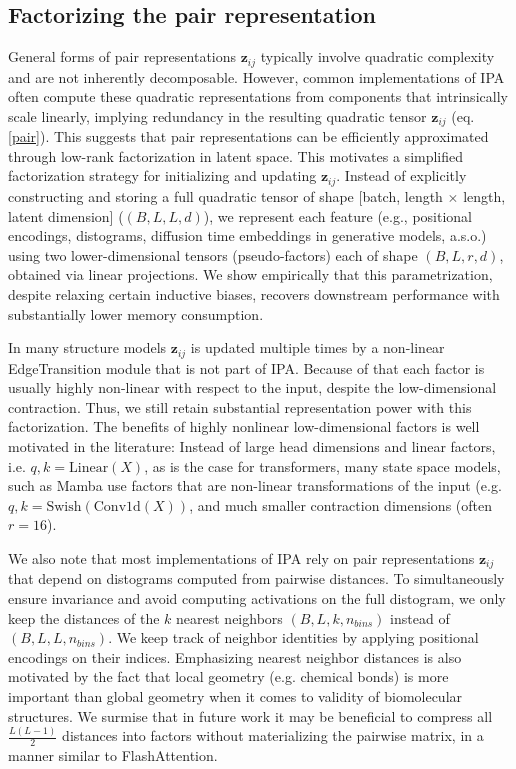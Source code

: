 \documentclass{article}
\begin{document}
\subsection{Factorizing the pair representation }
General forms of pair representations $\mathbf{z}_{ij}$ typically involve quadratic complexity and are not inherently decomposable. However, common implementations of IPA often compute these quadratic representations from components that intrinsically scale linearly, implying redundancy in the resulting quadratic tensor $\mathbf{z}_{ij}$ (eq. \eqref{pair}). This suggests that pair representations can be efficiently approximated through low-rank factorization in latent space. This motivates a simplified factorization strategy for initializing and updating $\mathbf{z}_{ij}$. Instead of explicitly constructing and storing a full quadratic tensor of shape [batch, length $\times$ length, latent dimension] ($(B,L,L,d)$), we represent each feature (e.g., positional encodings, distograms, diffusion time embeddings in generative models, a.s.o.) using two lower-dimensional tensors (pseudo-factors) each of shape $(B,L,r,d)$, obtained via linear projections. We show empirically that this parametrization, despite relaxing certain inductive biases, recovers downstream performance with substantially lower memory consumption.


In many structure models $\mathbf{z}_{ij}$ is updated multiple times by a non-linear EdgeTransition module that is not part of IPA. Because of that each factor is usually highly non-linear with respect to the input, despite the low-dimensional contraction. 
Thus, we still retain substantial representation power with this factorization. The benefits of highly nonlinear low-dimensional factors is well motivated in the literature:
Instead of large head dimensions and linear factors, i.e. $q,k=\textrm{Linear}\left(X\right)$, as is the case for transformers, many state space models, such as Mamba \cite{gu2023mamba} use factors that are non-linear transformations of the input (e.g. $q,k=\textrm{Swish}\left(\textrm{Conv1d}\left(X\right)\right)$, and much smaller contraction dimensions (often $r=16$).
    
We also note that most implementations of IPA rely on pair representations $\mathbf{z}_{ij}$ that depend on distograms computed from pairwise distances. To simultaneously ensure invariance and avoid computing activations on the full distogram, we only keep the distances of the $k$ nearest neighbors $(B,L,k,n_{bins})$ instead of $(B,L,L,n_{bins})$. We keep track of neighbor identities by applying positional encodings on their indices. Emphasizing nearest neighbor distances is also motivated by the fact that local geometry (e.g. chemical bonds) is more important than global geometry when it comes to validity of biomolecular structures. We surmise that in future work it may be beneficial to compress all $\frac{L(L-1)}{2}$ distances into factors without materializing the pairwise matrix, in a manner similar to FlashAttention.
\end{document}

